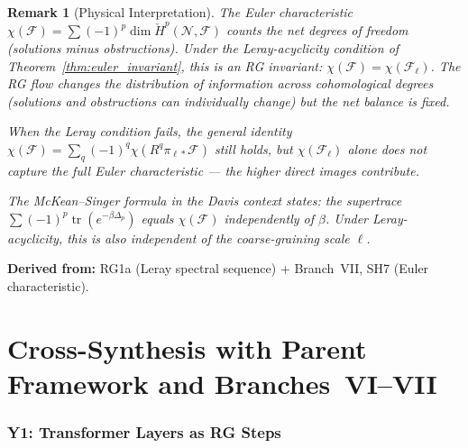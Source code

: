 \documentclass[11pt,letterpaper]{article}
\newtheorem{remark}[conjecture]{Remark}
\newcommand{\tr}{\operatorname{tr}}
\newcommand{\Hcech}{\check{H}}
\newcommand{\sheaf}{\mathcal{F}}
\newcommand{\nerve}{\mathcal{N}}
\begin{document}
\begin{remark}[Physical Interpretation]
\label{rem:euler_physical}
The Euler characteristic $\chi(\sheaf) = \sum (-1)^p \dim 
\Hcech^p(\nerve, \sheaf)$ counts the net degrees of freedom 
(solutions minus obstructions). Under the Leray-acyclicity 
condition of Theorem~\ref{thm:euler_invariant}, this is an RG 
invariant: $\chi(\sheaf) = \chi(\sheaf_\ell)$. The RG flow 
changes the distribution of information across cohomological 
degrees (solutions and obstructions can individually change) but 
the net balance is fixed.

When the Leray condition fails, the general identity 
$\chi(\sheaf) = \sum_q (-1)^q \chi(R^q \pi_{\ell *} \sheaf)$ 
still holds, but $\chi(\sheaf_\ell)$ alone does not capture the 
full Euler characteristic --- the higher direct images contribute.

The McKean--Singer formula in the Davis context states: the 
supertrace $\sum (-1)^p \tr(e^{-\beta \Delta_p})$ equals 
$\chi(\sheaf)$ independently of $\beta$. Under Leray-acyclicity, 
this is also independent of the coarse-graining scale $\ell$.
\end{remark}

\textbf{Derived from:} RG1a (Leray spectral sequence) + 
Branch~VII, SH7 (Euler characteristic).

\newpage
\part{Cross-Synthesis with Parent Framework and Branches~VI--VII}

\section{Y1: Transformer Layers as RG Steps}
\end{document}
